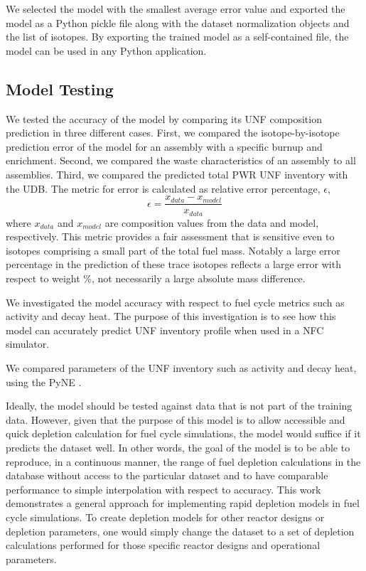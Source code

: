 We selected the model with the smallest average error value
and exported the model as a Python
pickle file along with the dataset normalization objects and 
the list of isotopes. By exporting the trained model
as a self-contained file, the model can be used in any Python
application.


\subsection{Model Testing}

We tested the accuracy of the model by comparing
its \gls{UNF} composition prediction
in three different cases. First, we compared the
isotope-by-isotope prediction error of the model for an
assembly with a specific burnup and enrichment.
Second, we compared the waste characteristics of
an assembly to all assemblies. Third, we compared
the predicted total \gls{PWR} \gls{UNF} inventory with the
\gls{UDB}. The metric for error is calculated as
relative error percentage, $\epsilon$,
\begin{equation}
\epsilon = \frac{x_{data} - x_{model}}{x_{data}}
\end{equation}
where $x_{data}$ and $x_{model}$ are composition values
from the data and model, respectively.
This metric provides a fair assessment 
that is sensitive even to isotopes comprising a small
part of the total fuel mass.
Notably a large error percentage in the
prediction of these trace isotopes reflects a large
error with respect to weight \%, not necessarily a large absolute
mass difference.


We investigated the model accuracy with respect to fuel
cycle metrics such as activity and decay heat. The purpose
of this investigation is to see how this model can accurately
predict \gls{UNF} inventory profile when used in a \gls{NFC} simulator.

We compared parameters of the \gls{UNF} inventory
such as activity and decay heat, using the
\gls{PyNE} \cite{scopatz_pyne:_2012}. 

Ideally, the model should be tested against data
that is not part of the training data. However, given
that the purpose of this model is to allow accessible and
quick depletion calculation for
fuel cycle simulations, the model would suffice if
it predicts the dataset well. In other words, the
goal of the model is to be able to reproduce,
in a continuous manner, the range of fuel depletion
calculations in the database without access to the particular dataset
and to have comparable performance to simple interpolation with respect to accuracy.
This work
demonstrates a general approach for implementing
rapid depletion models in fuel cycle simulations.
To create depletion models for other reactor designs or depletion parameters,
one would simply change the dataset to a set of depletion calculations performed
for those specific reactor designs and operational parameters. 


